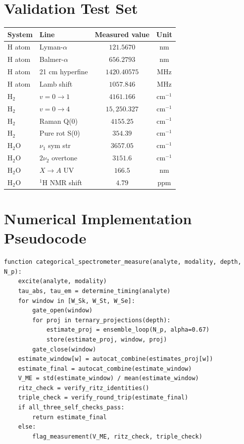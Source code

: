 \documentclass[twocolumn,11pt,a4paper]{article}
\theoremstyle{thmstyle}
\theoremstyle{axiomstyle}
\theoremstyle{definition}
\theoremstyle{remark}
\begin{document}
\section{Validation Test Set}
\label{app:testset}

\begin{center}
\small
\begin{tabular}{llcc}
\toprule
System & Line & Measured value & Unit\\
\midrule
H atom & Lyman-$\alpha$ & $121.5670$ & nm\\
H atom & Balmer-$\alpha$ & $656.2793$ & nm\\
H atom & 21 cm hyperfine & $1420.40575$ & MHz\\
H atom & Lamb shift & $1057.846$ & MHz\\
H$_{2}$ & $v=0\to 1$ & $4161.166$ & cm$^{-1}$\\
H$_{2}$ & $v=0\to 4$ & $15{,}250.327$ & cm$^{-1}$\\
H$_{2}$ & Raman Q(0) & $4155.25$ & cm$^{-1}$\\
H$_{2}$ & Pure rot S(0) & $354.39$ & cm$^{-1}$\\
H$_{2}$O & $\nu_{1}$ sym str & $3657.05$ & cm$^{-1}$\\
H$_{2}$O & $2\nu_{2}$ overtone & $3151.6$ & cm$^{-1}$\\
H$_{2}$O & $X\to A$ UV & $166.5$ & nm\\
H$_{2}$O & $^{1}$H NMR shift & $4.79$ & ppm\\
\bottomrule
\end{tabular}
\end{center}

\section{Numerical Implementation Pseudocode}
\label{app:pseudocode}

\begin{verbatim}
function categorical_spectrometer_measure(analyte, modality, depth, N_p):
    excite(analyte, modality)
    tau_abs, tau_em = determine_timing(analyte)
    for window in [W_Sk, W_St, W_Se]:
        gate_open(window)
        for proj in ternary_projections(depth):
            estimate_proj = ensemble_loop(N_p, alpha=0.67)
            store(estimate_proj, window, proj)
        gate_close(window)
    estimate_window[w] = autocat_combine(estimates_proj[w])
    estimate_final = autocat_combine(estimate_window)
    V_ME = std(estimate_window) / mean(estimate_window)
    ritz_check = verify_ritz_identities()
    triple_check = verify_round_trip(estimate_final)
    if all_three_self_checks_pass:
        return estimate_final
    else:
        flag_measurement(V_ME, ritz_check, triple_check)
\end{verbatim}



\end{document}
